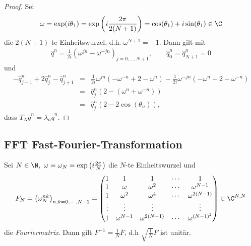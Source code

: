 \begin{proof}
    Sei
    \begin{eqnarray*}
        \omega = \exp(i \theta_1) = \exp\left(i \frac{2 \pi}{2 (N+1)}\right) =
        \cos(\theta_1) + i \sin(\theta_1) \in \C
    \end{eqnarray*}
    die $2 (N+1)$-te Einheitswurzel, d.h. $\omega^{N+1} = -1$.
    Dann gilt mit
    \begin{eqnarray*}
          \hat{q}^n
        = \frac{1}{2 i} \left(\omega^{jn} - \omega^{-jn}\right)_{j=0,\dots,N+1},
        \qquad \hat{q}^n_0 = \hat{q}^n_{N+1} = 0
    \end{eqnarray*}
    und
    \begin{eqnarray*}
            -\hat{q}^n_{j-1} + 2 \hat{q}^n_{j} - \hat{q}^n_{j+1}
        &=& \frac{1}{2i} \omega^{jn} \left(-\omega^{-n} + 2 - \omega^n\right)
            - \frac{1}{2i} \omega^{-jn} \left(-\omega^n + 2 - \omega^{-n}\right)
            \\
        &=& \hat{q}_j^n \left(2 - \left(\omega^n + \omega^{-n}\right)\right) \\
        &=& \hat{q}_j^n (2 - 2\cos(\theta_n)),
    \end{eqnarray*}
    dass $T_N \tilde{q}^n = \lambda_n \tilde{q}^n$.
\end{proof}


\subsection{FFT Fast-Fourier-Transformation}


\begin{Lemma}
    \label{lem:2.12}
    Sei $N \in \N, \ \omega = \omega_N = \exp\left(i \frac{2 \pi}{N}\right)$
    die $N$-te Einheitswurzel und
    \begin{eqnarray*}
        F_N = \left(\omega_N^{nk}\right)_{n, k = 0, \cdots, N - 1}
        = \begin{pmatrix}
              1 & 1 & 1 & \cdots & 1 \\
              1 & \omega & \omega^2 & \cdots & \omega^{N - 1} \\
              1 & \omega^2 & \omega^4 & \cdots & \omega^{2(N - 1)} \\
              \vdots & \vdots &\vdots & & \vdots \\
              1 & \omega^{N - 1} & \omega^{2(N - 1)} & \cdots
              & \omega^{(N - 1)^2}
          \end{pmatrix}\in \C^{N, N}
    \end{eqnarray*}
    die \emph{Fouriermatrix}. Dann gilt $F^{-1} = \frac{1}{N} \overline{F}$, d.h
    $\sqrt{\frac{1}{N}} F$ ist unitär.
\end{Lemma}


